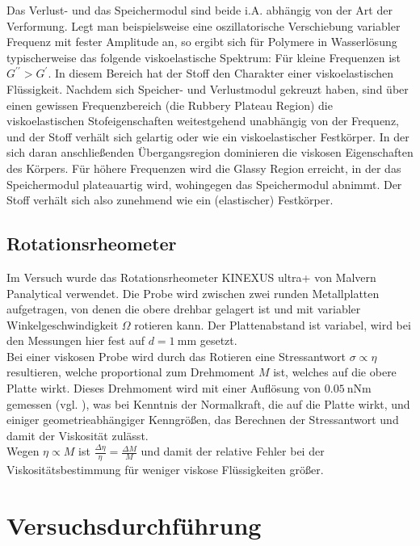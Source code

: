\documentclass[11pt,a4paper,oneside]{scrartcl}
\begin{document}
Das Verlust- und das Speichermodul sind beide i.A. abhängig von der Art der Verformung. Legt man beispielsweise eine oszillatorische Verschiebung variabler Frequenz mit fester Amplitude an, so ergibt sich für Polymere in Wasserlösung typischerweise das folgende viskoelastische Spektrum:
Für kleine Frequenzen ist $G^{\prime\prime}>G^{\prime}$. In diesem Bereich hat der Stoff den Charakter einer viskoelastischen Flüssigkeit. Nachdem sich Speicher- und Verlustmodul gekreuzt haben, sind über einen gewissen Frequenzbereich (die Rubbery Plateau Region) die viskoelastischen Stofeigenschaften weitestgehend unabhängig von der Frequenz, und der Stoff verhält sich gelartig oder wie ein viskoelastischer Festkörper. In der sich daran anschließenden Übergangsregion dominieren die viskosen Eigenschaften des Körpers. Für höhere Frequenzen wird die Glassy Region erreicht, in der das Speichermodul plateauartig wird, wohingegen das Speichermodul abnimmt. Der Stoff verhält sich also zunehmend wie ein (elastischer) Festkörper.
\subsection{Rotationsrheometer}\label{rheometer}
Im Versuch wurde das Rotationsrheometer KINEXUS ultra+ von Malvern Panalytical verwendet. Die Probe wird zwischen zwei runden Metallplatten aufgetragen, von denen die obere drehbar gelagert ist und mit variabler Winkelgeschwindigkeit $\Omega$ rotieren kann. Der Plattenabstand ist variabel, wird bei den Messungen hier fest auf $d=1\ \mathrm{mm}$ gesetzt. \\
Bei einer viskosen Probe wird durch das Rotieren eine Stressantwort $\sigma\propto\eta$ resultieren, welche proportional zum Drehmoment $M$ ist, welches auf die obere Platte wirkt. Dieses Drehmoment wird mit einer Auflösung von $0.05\ \mathrm{nNm}$ gemessen (vgl. \cite{malvern_2017}), was bei Kenntnis der Normalkraft, die auf die Platte wirkt, und einiger geometrieabhängiger Kenngrößen, das Berechnen der Stressantwort und damit der Viskosität zulässt.\\
Wegen $\eta\propto M$ ist $\frac{\Delta\eta}{\eta}=\frac{\Delta M}{M}$ und damit der relative Fehler bei der Viskositätsbestimmung für weniger viskose Flüssigkeiten größer.
\section{Versuchsdurchführung}
\end{document}
